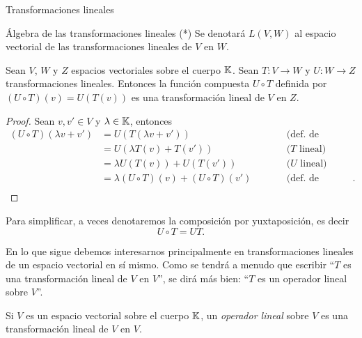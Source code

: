 \begin{chapter}{Transformaciones lineales}
\begin{section}{\'Algebra de las transformaciones lineales (*)}
        Se denotará  $L(V,W)$ al espacio vectorial de las transformaciones lineales de $V$ en $W$.
        
        \begin{teorema}\label{th-6-hoffman}
            Sean $V$, $W$ y $Z$ espacios vectoriales sobre el cuerpo $\mathbb K$.  Sean $T: V \to W$ y $U: W \to Z$ 
            transformaciones lineales. Entonces la función compuesta $U\circ T$ definida por $(U\circ T)(v) = U(T(v))$ es una transformación lineal de $V$ en $Z$.
        \end{teorema} 
        \begin{proof} Sean $v, v' \in V$ y $\lambda \in \mathbb K$, entonces
            \begin{equation*}
            \begin{array}{rlll}
                (U\circ T)(\lambda v + v') &= U(T(\lambda v + v'))&\qquad&\text{(def. de composición)} \\
                 &= U(\lambda T( v) + T(v'))&\qquad&\text{($T$ lineal)} \\
                 &= \lambda U(T( v)) + U(T(v'))&\qquad&\text{($U$ lineal)} \\
                 &= \lambda (U\circ T)( v) + (U\circ T)(v')&\qquad&\text{(def. de composición)}. \\
            \end{array}
            \end{equation*}
            
        \end{proof}
        
        Para simplificar, a veces  denotaremos la composición por yuxtaposición,  es decir $$U\circ T = U T.$$
        
        
        En lo que sigue debemos interesarnos principalmente en transformaciones lineales de un espacio vectorial en sí mismo. Como se tendrá a menudo que 	escribir ``$T$ es una transformación lineal de $V$ en $V$'', se dirá más bien: ``$T$ es un operador lineal sobre $V$''. 
        
        \begin{definicion}
            Si $V$ es un espacio vectorial sobre el cuerpo $\mathbb K$, un \textit{operador lineal} sobre $V$ es una transformación lineal de $V$ en $V$.
        \end{definicion}
        

\end{section}
\end{chapter}
